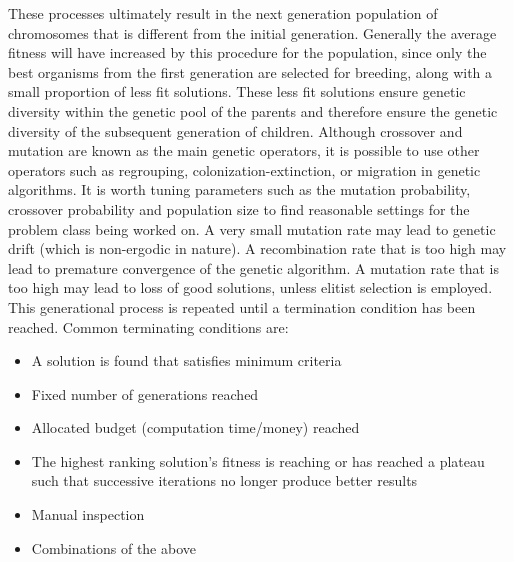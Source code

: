 These processes ultimately result in the next generation population of chromosomes that is different from the initial generation. Generally the average fitness will have increased by this procedure for the population, since only the best organisms from the first generation are selected for breeding, along with a small proportion of less fit solutions. These less fit solutions ensure genetic diversity within the genetic pool of the parents and therefore ensure the genetic diversity of the subsequent generation of children.
Although crossover and mutation are known as the main genetic operators, it is possible to use other operators such as regrouping, colonization-extinction, or migration in genetic algorithms.
It is worth tuning parameters such as the mutation probability, crossover probability and population size to find reasonable settings for the problem class being worked on. A very small mutation rate may lead to genetic drift (which is non-ergodic in nature). A recombination rate that is too high may lead to premature convergence of the genetic algorithm. A mutation rate that is too high may lead to loss of good solutions, unless elitist selection is employed.
This generational process is repeated until a termination condition has been reached. Common terminating conditions are:
\begin{itemize}
\item A solution is found that satisfies minimum criteria
\item Fixed number of generations reached
\item Allocated budget (computation time/money) reached
\item The highest ranking solution's fitness is reaching or has reached a plateau such that successive iterations no longer produce better results
\item Manual inspection
\item Combinations of the above
\end{itemize}

